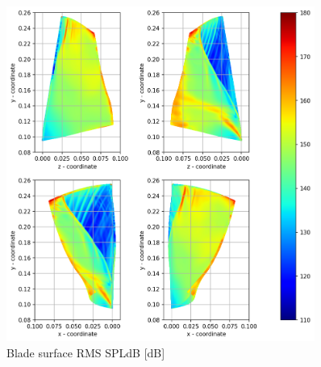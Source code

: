 \begin{figure}[ht]
	\centering
	\includegraphics[width=0.9\textwidth]{Figures/blade-rms-spldb.png}
	\caption{Blade surface RMS SPLdB [dB]} \label{blade-rms-spldb}
\end{figure}

